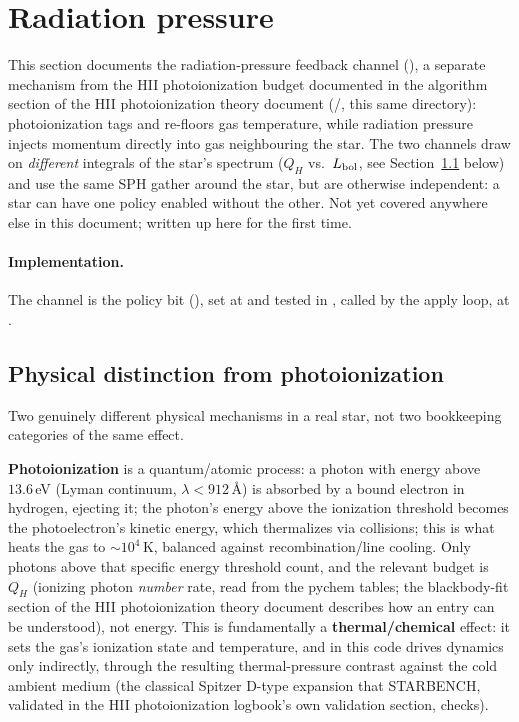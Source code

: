 \section{Radiation pressure}
\label{sec:radiation-pressure}

This section documents the radiation-pressure feedback channel
(), a separate mechanism
from the HII photoionization budget documented in the algorithm
section of the HII photoionization theory document
(/, this same directory):
photoionization tags and re-floors gas
temperature, while radiation pressure injects momentum directly into
gas neighbouring the star. The two channels draw on \emph{different}
integrals of the star's spectrum ($Q_H$ vs.\ $L_{\rm bol}$, see
Section~\ref{sec:rp-vs-hii} below) and use the same SPH gather around
the star, but are otherwise independent: a star can have one policy
enabled without the other. Not yet covered anywhere else in this
document; written up here for the first time.

\paragraph{Implementation.} The channel is the policy bit
(), set at
 and tested in , called by the apply loop, at
.

\subsection{Physical distinction from photoionization}
\label{sec:rp-vs-hii}

Two genuinely different physical mechanisms in a real star, not two
bookkeeping categories of the same effect.

\textbf{Photoionization} is a quantum/atomic process: a photon with
energy above $13.6\,$eV (Lyman continuum, $\lambda<912\,$\AA) is
absorbed by a bound electron in hydrogen, ejecting it; the photon's
energy above the ionization threshold becomes the photoelectron's
kinetic energy, which thermalizes via collisions; this is what heats
the gas to $\sim10^4\,$K, balanced against recombination/line cooling.
Only photons above that specific energy threshold count, and the
relevant budget is $Q_H$ (ionizing photon \emph{number} rate, read from the pychem tables;
the blackbody-fit section of the HII photoionization theory document
describes how an entry can be understood), not energy.
This is fundamentally a \textbf{thermal/chemical} effect: it sets the
gas's ionization state and temperature, and in this code drives
dynamics only indirectly, through the resulting thermal-pressure
contrast against the cold ambient medium (the classical Spitzer D-type
expansion that STARBENCH, validated in the HII photoionization
logbook's own validation section, checks).

